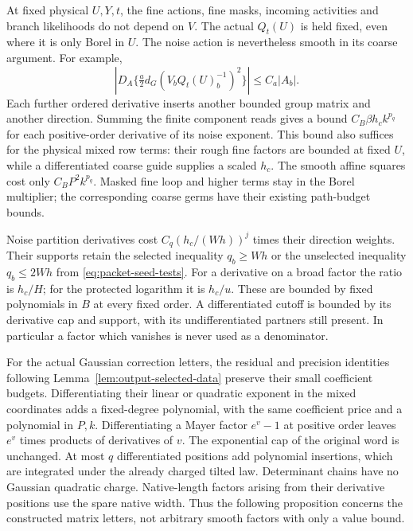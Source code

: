 \documentclass[11pt,reqno]{amsart}
\numberwithin{equation}{section}
\theoremstyle{definition}
\theoremstyle{remark}
\begin{document}
At fixed physical \(U,Y,t\), the fine actions, fine masks,
incoming activities and branch likelihoods do not depend on
\(V\). The actual \(Q_t(U)\) is held fixed, even where it is
only Borel in \(U\). The noise action is nevertheless smooth
in its coarse argument. For example,
\[
 |D_A\{\tfrac a2d_G(V_bQ_t(U)_b^{-1})^2\}|
                                                   \le C_a|A_b|.
\]
Each further ordered derivative inserts another bounded group
matrix and another direction. Summing the finite component
reads gives a bound \(C_B\beta h_c k^{p_q}\) for each
positive-order derivative of its noise exponent. This bound
also suffices for the physical mixed row terms: their rough
fine factors are bounded at fixed \(U\), while a differentiated
coarse guide supplies a scaled \(h_c\). The smooth affine
squares cost only \(C_BP^2k^{p_q}\). Masked fine loop and
higher terms stay in the Borel multiplier; the corresponding
coarse germs have their existing path-budget bounds.

Noise partition derivatives cost
\(C_q(h_c/(Wh))^j\) times their direction weights. Their
supports retain the selected inequality \(q_b\ge Wh\) or
the unselected inequality \(q_b\le2Wh\) from
\eqref{eq:packet-seed-tests}. For a derivative on a broad
factor the ratio is \(h_c/H\); for the protected logarithm
it is \(h_c/u\). These are bounded by fixed polynomials
in \(B\) at every fixed order. A differentiated cutoff is
bounded by its derivative cap and support, with its
undifferentiated partners still present. In particular a
factor which vanishes is never used as a denominator.

For the actual Gaussian correction letters, the residual and
precision identities following Lemma~\ref{lem:output-selected-data}
preserve their small coefficient budgets. Differentiating their
linear or quadratic exponent in the mixed coordinates adds a
fixed-degree polynomial, with the same coefficient price and
a polynomial in \(P,k\). Differentiating a Mayer factor
\(e^v-1\) at positive order leaves \(e^v\) times products of
derivatives of \(v\). The exponential cap of the original word
is unchanged. At most \(q\) differentiated positions add
polynomial insertions, which are integrated under the already
charged tilted law. Determinant chains have no Gaussian
quadratic charge. Native-length factors arising from their
derivative positions use the spare native width. Thus the
following proposition concerns the constructed matrix letters,
not arbitrary smooth factors with only a value bound.
\end{document}

